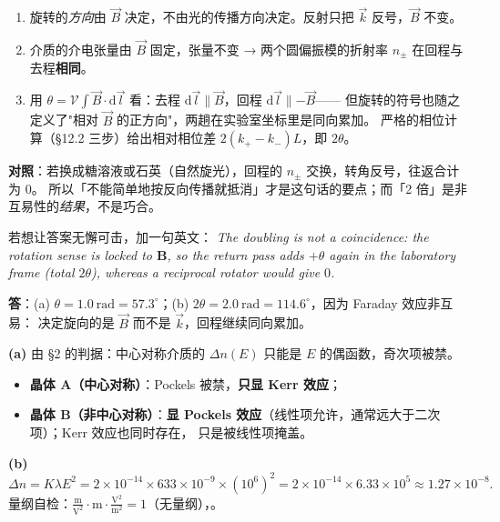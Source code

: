 \documentclass[11pt]{ctexart}
\newcommand{\vdt}{\mathcal{V}}
\begin{document}
\begin{enumerate}
\item 旋转的\emph{方向}由 $\vec B$ 决定，不由光的传播方向决定。反射只把 $\vec k$ 反号，$\vec B$ 不变。
\item 介质的介电张量由 $\vec B$ 固定，张量不变 → 两个圆偏振模的折射率 $n_\pm$ 在回程与去程\textbf{相同}。
\item 用 $\theta=\vdt\int\vec B\cdot\mathrm d\vec l$ 看：去程 $\mathrm d\vec l\parallel\vec B$，回程 $\mathrm d\vec l\parallel-\vec B$——
      但旋转的符号也随之定义了"相对 $\vec B$ 的正方向"，两趟在实验室坐标里是同向累加。
      严格的相位计算（§12.2 三步）给出相对相位差 $2(k_+-k_-)L$，即 $2\theta$。
\end{enumerate}

\textbf{对照}：若换成糖溶液或石英（自然旋光），回程的 $n_\pm$ 交换，转角反号，往返合计为 $0$。
所以「不能简单地按反向传播就抵消」才是这句话的要点；而「2 倍」是非互易性的\emph{结果}，不是巧合。

若想让答案无懈可击，加一句英文：
\emph{The doubling is not a coincidence: the rotation sense is locked to $\mathbf{B}$, so the return pass
adds $+\theta$ again in the laboratory frame (total $2\theta$), whereas a reciprocal rotator would give $0$.}

\textbf{答}：(a) $\theta=1.0\ \mathrm{rad}=57.3^\circ$；(b) $2\theta=2.0\ \mathrm{rad}=114.6^\circ$，因为 Faraday 效应非互易：
决定旋向的是 $\vec B$ 而不是 $\vec k$，回程继续同向累加。


\textbf{(a)} 由 §2 的判据：中心对称介质的 $\Delta n(E)$ 只能是 $E$ 的偶函数，奇次项被禁。
\begin{itemize}
\item \textbf{晶体 A（中心对称）}：Pockels 被禁，\textbf{只显 Kerr 效应}；
\item \textbf{晶体 B（非中心对称）}：\textbf{显 Pockels 效应}（线性项允许，通常远大于二次项）；Kerr 效应也同时存在，
      只是被线性项掩盖。
\end{itemize}

\textbf{(b)}
\begin{equation}
\Delta n=K\lambda E^2=2\times10^{-14}\times633\times10^{-9}\times\left(10^{6}\right)^2
=2\times10^{-14}\times6.33\times10^{5}\approx1.27\times10^{-8}.
\end{equation}
量纲自检：$\frac{\mathrm{m}}{\mathrm{V^2}}\cdot\mathrm{m}\cdot\frac{\mathrm{V^2}}{\mathrm{m^2}}=1$（无量纲），\checkmark。
\end{document}
